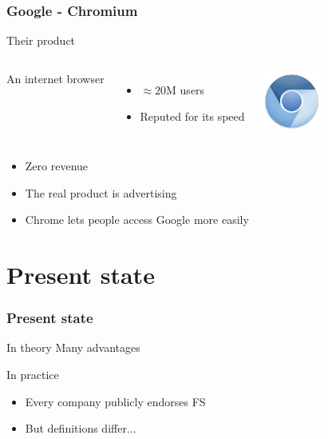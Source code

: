 \documentclass{beamer}
\begin{document}
\begin{frame}

  \frametitle{Google - Chromium}

  \begin{block}{Their product}
    \begin{columns}[c]

      An internet browser
      \begin{itemize}
        \item{$\approx 20$M users}
        \item{Reputed for its speed}
      \end{itemize}

      \includegraphics[width=2cm]{logo_chromium.png}

    \end{columns}
  \end{block}

  \vfill

  \begin{itemize}
    \item<2->{Zero revenue}
    \item<3->{The real product is advertising}
    \item<4>{Chrome lets people access Google more easily}
  \end{itemize}

\end{frame}

\section{Present state}

\begin{frame}

  \frametitle{Present state}

  \begin{block}{In theory}
    Many advantages
  \end{block}

  \vfill

  \begin{block}{In practice}
    \begin{itemize}
      \item<2->{Every company publicly endorses FS}
      \item<3->{But definitions differ...}
    \end{itemize}
  \end{block}

\end{frame}
\end{document}
